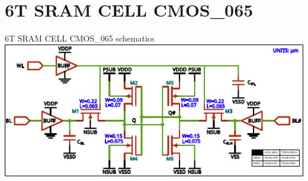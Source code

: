 
\section{6T SRAM CELL CMOS\_065}
\begin{frame}{6T SRAM CELL CMOS\_065 schematics}
	\vspace{7.5mm}
	\centering
	\includegraphics[width=1.0\textwidth]{./figures/sram_simulated.pdf}
\end{frame}

